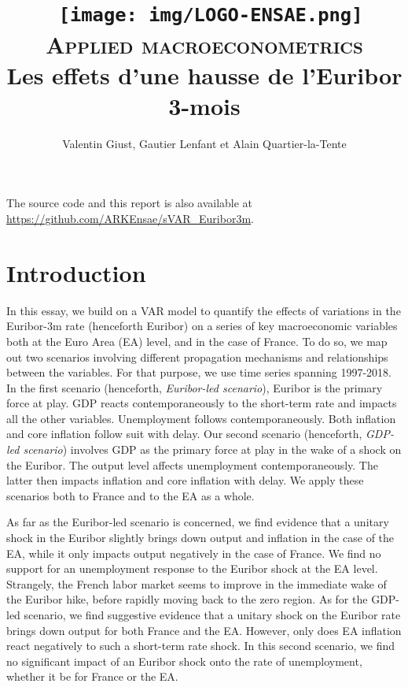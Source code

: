 \documentclass[
  11pt,
]{article}
\title{~\texttt{[image: img/LOGO-ENSAE.png]}\\
\hspace*{0.333em}\textsc{Applied macroeconometrics}\\
\hspace*{0.333em}Les effets d'une hausse de l'Euribor 3-mois}
\author{Valentin Giust, Gautier Lenfant et Alain Quartier-la-Tente}
\date{}
\begin{document}
\maketitle

{
\hypersetup{linkcolor=}
\setcounter{tocdepth}{2}
\tableofcontents
}
\vfill

The source code and this report is also available at \url{https://github.com/ARKEnsae/sVAR_Euribor3m}.

\newpage

\hypertarget{introduction}{%
\section*{Introduction}\label{introduction}}

In this essay, we build on a VAR model to quantify the effects of variations in the Euribor-3m rate (henceforth Euribor) on a series of key macroeconomic variables both at the Euro Area (EA) level, and in the case of France.
To do so, we map out two scenarios involving different propagation mechanisms and relationships between the variables.
For that purpose, we use time series spanning 1997-2018.
In the first scenario (henceforth, \emph{Euribor-led scenario}), Euribor is the primary force at play.
GDP reacts contemporaneously to the short-term rate and impacts all the other variables.
Unemployment follows contemporaneously.
Both inflation and core inflation follow suit with delay.
Our second scenario (henceforth, \emph{GDP-led scenario}) involves GDP as the primary force at play in the wake of a shock on the Euribor.
The output level affects unemployment contemporaneously.
The latter then impacts inflation and core inflation with delay.
We apply these scenarios both to France and to the EA as a whole.

As far as the Euribor-led scenario is concerned, we find evidence that a unitary shock in the Euribor slightly brings down output and inflation in the case of the EA, while it only impacts output negatively in the case of France.
We find no support for an unemployment response to the Euribor shock at the EA level.
Strangely, the French labor market seems to improve in the immediate wake of the Euribor hike, before rapidly moving back to the zero region.
As for the GDP-led scenario, we find suggestive evidence that a unitary shock on the Euribor rate brings down output for both France and the EA.
However, only does EA inflation react negatively to such a short-term rate shock.
In this second scenario, we find no significant impact of an Euribor shock onto the rate of unemployment, whether it be for France or the EA.
\end{document}
